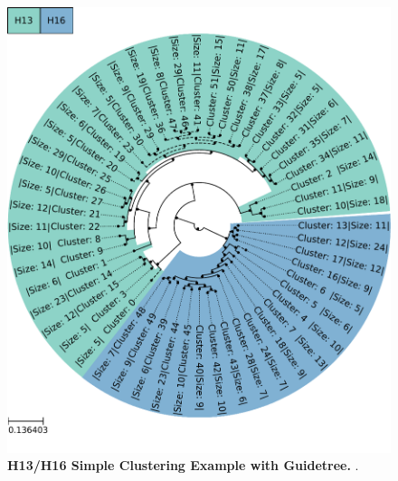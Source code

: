 \begin{figure}[hbt]
    \centering
    \includegraphics[width=\textwidth]{PCA/Clustertree_Segment_4_H_Focus.pdf}
    \caption[H13/H16 Simple Clustering Example with Guidetree]{\textbf{H13/H16 Simple Clustering Example with Guidetree.} .}
    \label{fig:Simple_Clustertree_MSA}
\end{figure}

